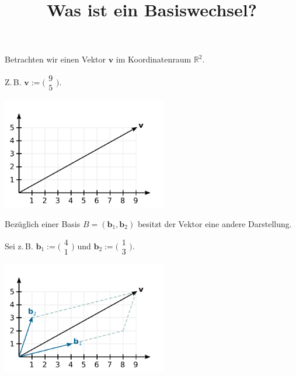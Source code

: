 \documentclass[9pt]{beamer}
\title{Was ist ein Basiswechsel?}
\date{}
\newcommand{\bv}[1]{\mathbf{#1}}
\newcommand{\R}{\mathbb R}
\newcommand{\icol}[1]{
  \big(\!\begin{smallmatrix}#1\end{smallmatrix}\!\big)%
}
\newcommand{\parspace}{\vspace{0.8em}}
\begin{document}
\begin{frame}
\maketitle
\end{frame}

\begin{frame}[t]
\vspace{3em}
Betrachten wir einen Vektor $\bv v$ im Koordinatenraum $\R^2$.

\parspace
Z.\,B. $\bv v:=\icol{9\\ 5}$.\pause

\vspace{-1em}
\begin{center}
\includegraphics[width=72mm]{img/Vektor.pdf}
\end{center}
\end{frame}

\begin{frame}[t]
\vspace{3em}
Bezüglich einer Basis $B=(\bv b_1,\bv b_2)$ besitzt der
Vektor eine andere Darstellung.\pause

\vspace{0.8em}
Sei z.\,B. $\bv b_1 := \icol{4\\ 1}$ und $\bv b_2 := \icol{1\\ 3}$.%
\pause

\vspace{-1.6em}
\begin{center}
\includegraphics[width=72mm]{img/Vektor-in-Basis-B.pdf}
\end{center}
\end{frame}
\end{document}
